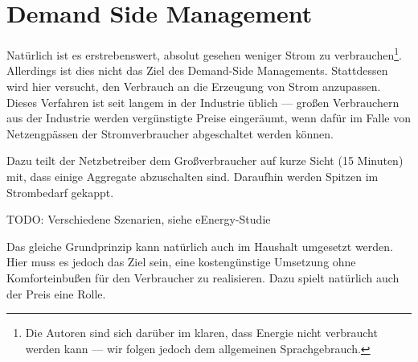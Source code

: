 
\section{Demand Side Management}\label{sec:demandside}
Natürlich ist es erstrebenswert, absolut gesehen weniger Strom zu
verbrauchen\footnote{Die Autoren sind sich darüber im klaren, dass Energie
nicht verbraucht werden kann --- wir folgen jedoch dem allgemeinen
Sprachgebrauch.}. Allerdings ist dies nicht das Ziel des Demand-Side
Managements. Stattdessen wird hier versucht, den Verbrauch an die
Erzeugung von Strom anzupassen. Dieses Verfahren ist seit langem in der
Industrie üblich --- großen Verbrauchern aus der Industrie werden
vergünstigte Preise eingeräumt, wenn dafür im Falle von Netzengpässen
der Stromverbraucher abgeschaltet werden können. 

Dazu teilt der Netzbetreiber dem Großverbraucher auf kurze Sicht (15
Minuten) mit, dass einige Aggregate abzuschalten sind. Daraufhin werden
Spitzen im Strombedarf gekappt.

TODO: Verschiedene Szenarien, siehe eEnergy-Studie

Das gleiche Grundprinzip kann natürlich auch im Haushalt umgesetzt
werden. Hier muss es jedoch das Ziel sein, eine kostengünstige Umsetzung
ohne Komforteinbußen für den Verbraucher zu realisieren. Dazu spielt
natürlich auch der Preis eine Rolle.

